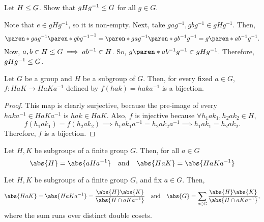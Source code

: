 \documentclass[11pt]{penrose}
\begin{document}
\begin{nex}
    Let $H \mathrel{\leq} G$. Show that $gHg^{-1} \mathrel{\leq} G$ for all $g \in G$.

    Note that $e \in gHg^{-1}$, so it is non-empty. Next, take $gag^{-1}, gbg^{-1} \in gHg^{-1}$. Then,
    \begin{equation*}
        \paren*{gag^{-1}} \paren*{gbg^{-1}}^{-1} = \paren*{gag^{-1}} \paren*{gb^{-1}g^{-1}} = g \paren*{ab^{-1}} g^{-1}.
    \end{equation*}
    Now, $a, b \in H \mathrel{\leq} G \implies ab^{-1} \in H$. So, $g \paren*{ab^{-1}} g^{-1} \in gHg^{-1}$. Therefore, $gHg^{-1} \mathrel{\leq} G$.
\end{nex}

\begin{nlemma}
    Let $G$ be a group and $H$ be a subgroup of $G$. Then, for every fixed $a \in G$, $f : HaK \to H a K a^{-1}$ defined by $f(hak) = haka^{-1}$ is a bijection.
\end{nlemma}
\begin{proof}
    This map is clearly surjective, because the pre-image of every $haka^{-1} \in HaKa^{-1}$ is $hak \in HaK$. Also, $f$ is injective because $\forall h_{1}ak_{1}, h_{2}ak_{2} \in H$,
    \begin{equation*}
        f(h_{1}ak_{1}) = f(h_{2}ak_{2}) \implies h_{1}ak_{1}a^{-1} = h_{2}ak_{2}a^{-1} \implies h_{1}ak_{1} = h_{2}ak_{2}.
    \end{equation*}
    Therefore, $f$ is a bijection.
\end{proof}

\begin{ncor}
    Let $H, K$ be subgroups of a finite group $G$. Then, for all $a \in G$
    \begin{equation*}
        \abs{H} = \abs{aHa^{-1}}
        \quad\text{and}\quad
        \abs{HaK} = \abs{HaKa^{-1}}
    \end{equation*}
\end{ncor}

\begin{remark}
    Let $H, K$ be subgroups of a finite group $G$, and fix $a \in G$. Then,
    \begin{equation*}
        \abs{HaK} = \abs{HaKa^{-1}} = \frac{\abs{H}\abs{K}}{\abs{H \cap aKa^{-1}}}
        \quad\text{and}\quad
        \abs{G} = \sum_{a \in G} \frac{\abs{H}\abs{K}}{\abs{H \cap aKa^{-1}}},
    \end{equation*}
    where the sum runs over distinct double cosets.
\end{remark}
\end{document}
